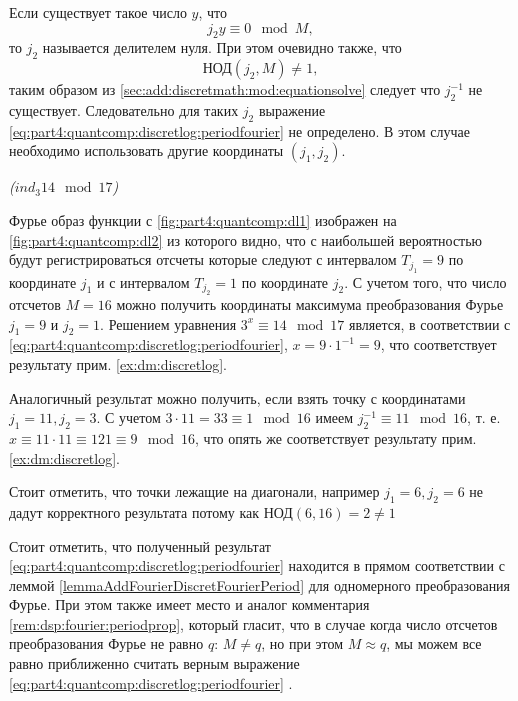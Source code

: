 \begin{remark}
Если существует такое число $y$, что 
\[
j_2 y \equiv 0 \mod M,
\]
то $j_2$ называется делителем нуля. 
При этом очевидно также, что 
\[
\mbox{НОД}\left(j_2, M\right) \ne 1,
\]
таким образом из \autoref{sec:add:discretmath:mod:equationsolve}
следует что $j_2^{-1}$ не существует. Следовательно для таких
$j_2$ выражение
\eqref{eq:part4:quantcomp:discretlog:periodfourier} не определено. В
этом случае необходимо использовать другие координаты $(j_1, j_2)$. 
\end{remark}

\begin{example}
\emph{($ind_3{14} \mod{17}$)}
%



Фурье образ функции с \autoref{fig:part4:quantcomp:dl1} изображен на
\autoref{fig:part4:quantcomp:dl2} из которого видно, что с наибольшей
вероятностью будут регистрироваться отсчеты которые следуют с
интервалом $T_{j_1} = 9$ по координате $j_1$ и с интервалом $T_{j_2} =
1$ по координате $j_2$. С учетом того, что число отсчетов $M=16$ можно
получить координаты максимума преобразования Фурье $j_1 = 9$
и $j_2 = 1$. Решением уравнения $3^x \equiv 14 \mod 17$
является, в соответствии с
\eqref{eq:part4:quantcomp:discretlog:periodfourier}, $x = 9 \cdot 1^{-1}
= 9$, что соответствует результату прим. 
\ref{ex:dm:discretlog}.

Аналогичный результат можно получить, если взять точку с координатами 
$j_1 = 11, j_2 = 3$. С учетом $3 \cdot 11 = 33 \equiv 1 \mod 16$ имеем
$j_2^{-1} \equiv 11 \mod 16$, т. е. $x \equiv 11 \cdot 11 \equiv 121
\equiv 9 \mod 16$, что опять же соответствует результату прим. 
\ref{ex:dm:discretlog}.

Стоит отметить, что точки лежащие на диагонали, например $j_1 = 6, j_2
= 6$ не дадут корректного результата потому как $\mbox{НОД}\left(6,
16\right) = 2 \ne 1$

\label{ex:part4:quantcomp:discretlog:periodfinding}
\end{example}

Стоит отметить, что полученный результат
\eqref{eq:part4:quantcomp:discretlog:periodfourier} находится в прямом
соответствии с леммой \ref{lemmaAddFourierDiscretFourierPeriod} для
одномерного преобразования Фурье. При этом также имеет место и аналог
комментария \ref{rem:dsp:fourier:periodprop}, который гласит, что в
случае когда число отсчетов преобразования Фурье не равно $q$: $M \ne
q$, но при этом $M \approx q$, мы можем все равно приближенно считать
верным выражение 
\eqref{eq:part4:quantcomp:discretlog:periodfourier}
\cite{Proos:2003:SDL:2011528.2011531}.  



